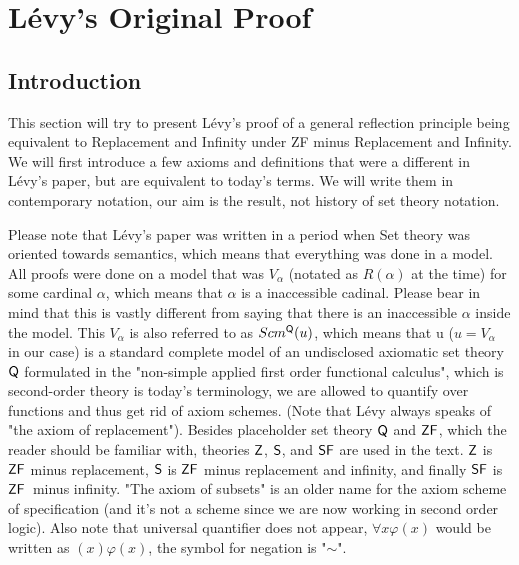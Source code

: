 \documentclass[12pt,a4paper]{article}
\begin{document}

% 


\newpage
\section{Lévy's Original Proof}\label{sec:fixed}

\subsection{Introduction}\label{sec:Levy1960}
This section will try to present Lévy's proof of a general reflection principle being equivalent to Replacement and Infinity under ZF minus Replacement and Infinity.
We will first introduce a few axioms and definitions that were a different in Lévy's paper\cite{Levy60a}, but are equivalent to today's terms. We will write them in contemporary notation, our aim is the result, not history of set theory notation. 

Please note that Lévy's paper was written in a period when Set theory was oriented towards semantics, which means that everything was done in a model. All proofs were done on a model that was $V_\alpha$ (notated as $R(\alpha)$ at the time) for some cardinal $\alpha$, which means that $\alpha$ is a inaccessible cadinal. Please bear in mind that this is vastly different from saying that there is an inaccessible $\alpha$ inside the model. This $V_\alpha$ is also referred to as $Scm^{\sf{Q}}(u)$, which means that u ($u=V_\alpha$ in our case) is a standard complete model of an undisclosed axiomatic set theory $\sf{Q}$ formulated in the "non-simple applied first order functional calculus", which is second-order theory is today's terminology, we are allowed to quantify over functions and thus get rid of axiom schemes. (Note that Lévy always speaks of "the axiom of replacement"). Besides placeholder set theory $\sf{Q}$ and $\sf{ZF}$, which the reader should be familiar with, theories $\sf{Z}$, $\sf{S}$, and $\sf{SF}$ are used in the text. $\sf{Z}$ is $\sf{ZF}$ minus replacement, $\sf{S}$ is $\sf{ZF}$ minus replacement and infinity, and finally $\sf{SF}$ is $\sf{ZF}$ minus infinity. "The axiom of subsets" is an older name for the axiom scheme of specification (and it's not a scheme since we are now working in second order logic). Also note that universal quantifier does not appear, $\forall x \varphi (x)$ would be written as $(x) \varphi (x)$, the symbol for negation is "$\sim$".
\end{document}
